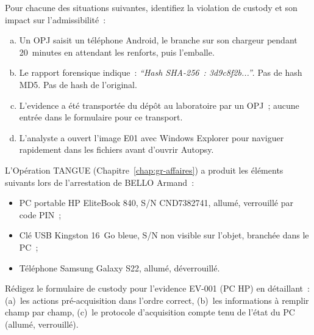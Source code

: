 \begin{boxexo}[title={\ding{45}\quad Exercice~8.1 --- Diagnostic de custody \niveaubase}]
Pour chacune des situations suivantes, identifiez la violation de custody
et son impact sur l'admissibilité~:
\begin{enumerate}[(a)]
    \item Un OPJ saisit un téléphone Android, le branche sur son chargeur
          pendant 20~minutes en attendant les renforts, puis l'emballe.
    \item Le rapport forensique indique~: \textit{``Hash SHA-256~:
          3d9c8f2b...''}. Pas de hash MD5. Pas de hash de l'original.
    \item L'evidence a été transportée du dépôt au laboratoire par un
          OPJ~; aucune entrée dans le formulaire pour ce transport.
    \item L'analyste a ouvert l'image E01 avec Windows Explorer pour
          naviguer rapidement dans les fichiers avant d'ouvrir Autopsy.
\end{enumerate}
\end{boxexo}

\begin{boxexo}[title={\ding{45}\quad Exercice~8.2 --- Remplissage de formulaire \niveaumoyen}]
L'Opération TANGUE (Chapitre~\ref{chap:gr-affaires}) a produit les
éléments suivants lors de l'arrestation de BELLO Armand~:
\begin{itemize}
    \item PC portable HP EliteBook 840, S/N CND7382741, allumé,
          verrouillé par code PIN~;
    \item Clé USB Kingston 16~Go bleue, S/N non visible sur l'objet,
          branchée dans le PC~;
    \item Téléphone Samsung Galaxy S22, allumé, déverrouillé.
\end{itemize}
Rédigez le formulaire de custody pour l'evidence EV-001 (PC HP) en
détaillant~: (a)~les actions pré-acquisition dans l'ordre correct,
(b)~les informations à remplir champ par champ, (c)~le protocole
d'acquisition compte tenu de l'état du PC (allumé, verrouillé).
\end{boxexo}

